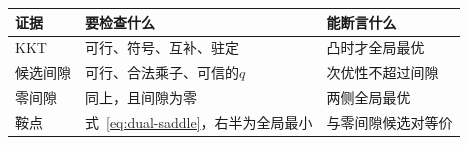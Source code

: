 \begin{BookInlineTable}
 \centering
 \begin{tabular}{@{}lll@{}}
  \toprule
  证据 & 要检查什么 & 能断言什么\\
  \midrule
  KKT & 可行、符号、互补、驻定 & 凸时才全局最优\\
  候选间隙 & 可行、合法乘子、可信的$q$ & 次优性不超过间隙\\
  零间隙 & 同上，且间隙为零 & 两侧全局最优\\
  鞍点 & 式~\eqref{eq:dual-saddle}，右半为全局最小 & 与零间隙候选对等价\\
  \bottomrule
 \end{tabular}
 \caption{几种最优性证据的比较。除KKT外，其余三种证据都不要求问题凸。}
 \label{tab:dual-certificate-compare}
\end{BookInlineTable}
